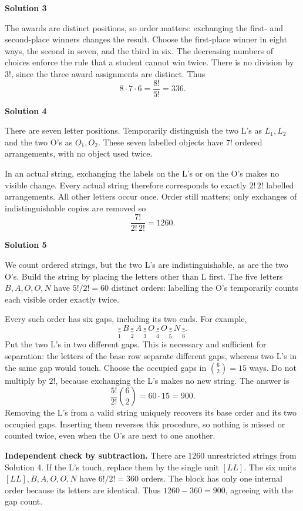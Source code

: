 \documentclass[11pt]{article}
\newcommand{\solution}[1]{%
  \par\Needspace{5\baselineskip}\addvspace{.8\baselineskip}%
  {\large\bfseries Solution #1\par}\nopagebreak[4]}
\begin{document}
\vspace{-8mm}

\solution{3}
The awards are distinct positions, so order matters: exchanging the first-
and second-place winners changes the result. Choose the first-place
winner in eight ways, the second in seven, and the third in six.
The decreasing numbers of choices enforce the rule that a student cannot
win twice. There is no division by $3!$, since the three award assignments are distinct. Thus
\[
8\cdot7\cdot6=\frac{8!}{5!}=\boxed{336}.
\]
 \vspace{-8mm}



\solution{4}
There are seven letter positions. Temporarily distinguish the two L's
as $L_1,L_2$ and the two O's as $O_1,O_2$. These seven labelled objects
have $7!$ ordered arrangements, with no object used twice.

In an actual string, exchanging the labels on the L's or on the O's
makes no visible change. Every actual string therefore corresponds to
exactly $2!\,2!$ labelled arrangements. All other letters occur once. Order still matters; only exchanges of indistinguishable copies are removed so
\[
\frac{7!}{2!\,2!}=\boxed{1260}.
\]
 \vspace{-12mm}

\solution{5}
We count ordered strings, but the two L's are indistinguishable, as are
the two O's. Build the string by placing the letters other than L first.
The five letters $B,A,O,O,N$ have $5!/2!=60$ distinct orders: labelling
the O's temporarily counts each visible order exactly twice.

Every such order has six gaps, including its two ends. For example,
\[
\underbrace{\square}_{1}\ B\
\underbrace{\square}_{2}\ A\
\underbrace{\square}_{3}\ O\
\underbrace{\square}_{4}\ O\
\underbrace{\square}_{5}\ N\
\underbrace{\square}_{6}.
\]
Put the two L's in two different gaps. This is necessary and sufficient
for separation: the letters of the base row separate different gaps,
whereas two L's in the same gap would touch. Choose the occupied gaps in
$\binom62=15$ ways. Do not multiply by $2!$, because exchanging the L's
makes no new string. The answer is
\[
\frac{5!}{2!}\binom62=60\cdot15=\boxed{900}.
\]
Removing the L's from a valid string uniquely recovers its base order
and its two occupied gaps. Inserting them reverses this procedure, so
nothing is missed or counted twice, even when the O's are next to one
another.

\textbf{Independent check by subtraction.} There are $1260$ unrestricted
strings from Solution 4. If the L's touch, replace them by the single
unit $[LL]$. The six units $[LL],B,A,O,O,N$ have $6!/2!=360$ orders.
The block has only one internal order because its letters are identical.
Thus $1260-360=900$, agreeing with the gap count.
\end{document}
